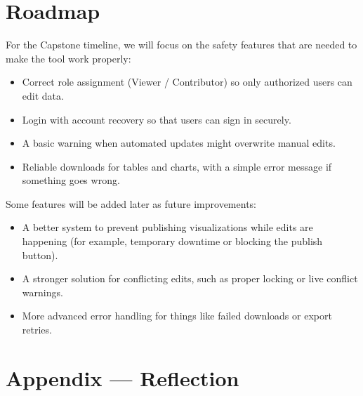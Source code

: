 \documentclass{article}
\begin{document}
\section{Roadmap}

For the Capstone timeline, we will focus on the safety features that are needed to make the tool work properly:

\begin{itemize}
    \item Correct role assignment (Viewer / Contributor) so only authorized users can edit data.
    \item Login with account recovery so that users can sign in securely.
    \item A basic warning when automated updates might overwrite manual edits.
    \item Reliable downloads for tables and charts, with a simple error message if something goes wrong.
\end{itemize}

Some features will be added later as future improvements:

\begin{itemize}
    \item A better system to prevent publishing visualizations while edits are happening (for example, temporary downtime or blocking the publish button).
    \item A stronger solution for conflicting edits, such as proper locking or live conflict warnings.
    \item More advanced error handling for things like failed downloads or export retries.
\end{itemize}


\newpage{}

\section*{Appendix --- Reflection}



\end{document}
